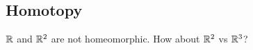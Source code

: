 




\newpage

\subsection{Homotopy}

\begin{example}
  $\mathbb{R}$ and $\mathbb{R}^2$ are not homeomorphic. How about $\mathbb{R}^2$ vs $\mathbb{R}^3$?
\end{example}

